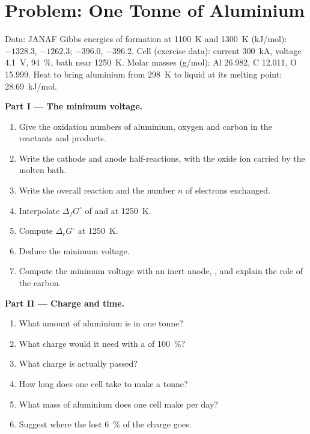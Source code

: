 \section{Problem: One Tonne of Aluminium}

\begin{problem}
\label{pb:b2:batteries-electrolysis:1}
Data: JANAF Gibbs energies of formation at \qty{1100}{K} and \qty{1300}{K}
(\unit{kJ/mol}):  $-1328.3$, $-1262.3$;  $-396.0$, $-396.2$. Cell
(exercise data): current \qty{300}{kA}, voltage \qty{4.1}{V}, 
94~\%, bath near \qty{1250}{K}. Molar masses (\unit{g/mol}): Al 26.982, C 12.011,
O 15.999. Heat to bring aluminium from \qty{298}{K} to liquid at its melting
point: \qty{28.69}{kJ/mol}.

\medskip
\noindent\textbf{Part I --- The minimum voltage.}
\begin{enumerate}
  \item Give the oxidation numbers of aluminium, oxygen and carbon in the
        reactants and products.
  \item Write the cathode and anode half-reactions, with the oxide ion
         carried by the molten bath.
  \item Write the overall reaction and the number $n$ of electrons exchanged.
  \item Interpolate $\Delta_f G^\circ$ of  and  at \qty{1250}{K}.
  \item Compute $\Delta_r G^\circ$ at \qty{1250}{K}.
  \item Deduce the minimum voltage.
  \item Compute the minimum voltage with an inert anode,
        , and explain the role of the carbon.
\end{enumerate}

\medskip
\noindent\textbf{Part II --- Charge and time.}
\begin{enumerate}[resume]
  \item What amount of aluminium is in one tonne?
  \item What charge would it need with a  of 100~\%?
  \item What charge is actually passed?
  \item How long does one cell take to make a tonne?
  \item What mass of aluminium does one cell make per day?
  \item Suggest where the lost 6~\% of the charge goes.
\end{enumerate}


\end{problem}
